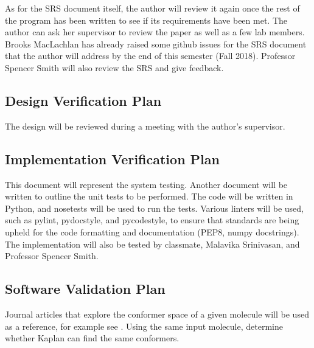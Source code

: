 \documentclass[12pt, titlepage]{article}
\newcommand{\progname}{Kaplan} %
\begin{document}
As for the SRS document itself, the author will review it again once the rest 
of the program has been written to see if its requirements have been met. The 
author can ask her supervisor to review the paper as well as a few lab members. 
Brooks MacLachlan has already raised some github issues for the SRS document 
that the author will address by the end of this semester (Fall 2018). Professor 
Spencer Smith will also review the SRS and give feedback.


\subsection{Design Verification Plan}

The design will be reviewed during a meeting with the author's supervisor.


\subsection{Implementation Verification Plan}

This document will represent the system testing. Another document will be 
written to outline the unit tests to be performed. The code will be written in 
Python, and nosetests will be used to run the tests. Various linters will be 
used, such as pylint, pydocstyle, and pycodestyle, to ensure that standards are 
being upheld for the code formatting and documentation (PEP8, numpy 
docstrings). The implementation will also be tested by classmate, Malavika 
Srinivasan, and Professor Spencer Smith. 


\subsection{Software Validation Plan}

Journal articles that explore the conformer space of a given molecule will be 
used as a reference, for example see \cite{butane-conformers}. Using the same 
input molecule, determine whether 
\progname{} can find the same conformers.
\end{document}
